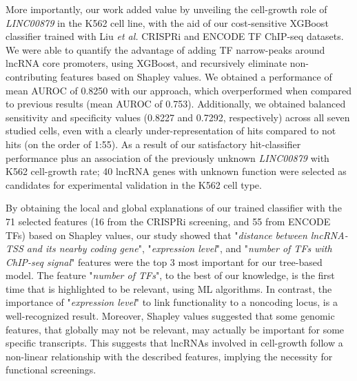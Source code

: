 More importantly, our work added value by unveiling the cell-growth role of \textit{LINC00879} in the K562 cell line, with the aid of our cost-sensitive XGBoost classifier trained with Liu \textit{et al.} CRISPRi and ENCODE TF ChIP-seq datasets.\autocite{liu_2020_crispri,encode_2011_user,encode_2004} We were able to quantify the advantage of adding TF narrow-peaks around lncRNA core promoters, using XGBoost, and recursively eliminate non-contributing features based on Shapley values. We obtained a performance of mean AUROC of 0.8250 with our approach, which overperformed when compared to previous results (mean AUROC of 0.753\autocite{liu_2020_crispri}). Additionally, we obtained balanced sensitivity and specificity values (0.8227 and 0.7292, respectively) across all seven studied cells, even with a clearly under-representation of hits compared to not hits (on the order of 1:55). As a result of our satisfactory hit-classifier performance plus an association of the previously unknown \textit{LINC00879} with K562 cell-growth rate; 40 lncRNA genes with unknown function were selected as candidates for experimental validation in the K562 cell type. 

By obtaining the local and global explanations of our trained classifier with the 71 selected features (16 from the CRISPRi screening, and 55 from ENCODE TFs) based on Shapley values, our study showed that "\textit{distance between lncRNA-TSS and its nearby coding gene}", "\textit{expression level}", and "\textit{number of TFs with ChIP-seq signal}" features were the top 3 most important for our tree-based model. The feature "\textit{number of TFs}", to the best of our knowledge, is the first time that is highlighted to be relevant, using ML algorithms. In contrast, the importance of "\textit{expression level}" to link functionality to a noncoding locus, is a well-recognized result.\autocite{liu_2020_crispri,Haswell_2021_crispri} Moreover, Shapley values suggested that some genomic features, that globally may not be relevant, may actually be important for some specific transcripts. This suggests that lncRNAs involved in cell-growth follow a non-linear relationship with the described features, implying the necessity for functional screenings.

